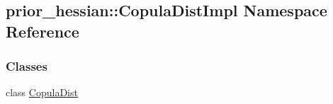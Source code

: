 \hypertarget{namespaceprior__hessian_1_1CopulaDistImpl}{}\subsection{prior\+\_\+hessian\+:\+:Copula\+Dist\+Impl Namespace Reference}
\label{namespaceprior__hessian_1_1CopulaDistImpl}
\subsubsection*{Classes}
\begin{DoxyCompactItemize}
\item 
class \hyperlink{classprior__hessian_1_1CopulaDistImpl_1_1CopulaDist}{Copula\+Dist}
\end{DoxyCompactItemize}
